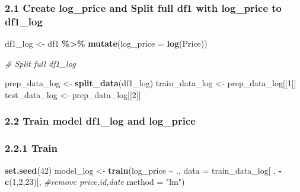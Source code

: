 \documentclass[
]{article}
\newenvironment{Shaded}{\begin{snugshade}}{\end{snugshade}}
\newcommand{\AttributeTok}[1]{\textcolor[rgb]{0.13,0.29,0.53}{#1}}
\newcommand{\CommentTok}[1]{\textcolor[rgb]{0.56,0.35,0.01}{\textit{#1}}}
\newcommand{\DecValTok}[1]{\textcolor[rgb]{0.00,0.00,0.81}{#1}}
\newcommand{\FunctionTok}[1]{\textcolor[rgb]{0.13,0.29,0.53}{\textbf{#1}}}
\newcommand{\NormalTok}[1]{#1}
\newcommand{\OtherTok}[1]{\textcolor[rgb]{0.56,0.35,0.01}{#1}}
\newcommand{\SpecialCharTok}[1]{\textcolor[rgb]{0.81,0.36,0.00}{\textbf{#1}}}
\newcommand{\StringTok}[1]{\textcolor[rgb]{0.31,0.60,0.02}{#1}}
\begin{document}
\hypertarget{create-log_price-and-split-full-df1-with-log_price-to-df1_log}{%
\subsubsection{2.1 Create log\_price and Split full df1 with log\_price
to
df1\_log}\label{create-log_price-and-split-full-df1-with-log_price-to-df1_log}}

\begin{Shaded}
\begin{Highlighting}[]
\NormalTok{df1\_log }\OtherTok{\textless{}{-}}\NormalTok{ df1 }\SpecialCharTok{\%\textgreater{}\%}
  \FunctionTok{mutate}\NormalTok{(}\AttributeTok{log\_price =} \FunctionTok{log}\NormalTok{(Price))}

\CommentTok{\# Split full df1\_log}

\NormalTok{prep\_data\_log }\OtherTok{\textless{}{-}} \FunctionTok{split\_data}\NormalTok{(df1\_log)}
\NormalTok{train\_data\_log }\OtherTok{\textless{}{-}}\NormalTok{ prep\_data\_log[[}\DecValTok{1}\NormalTok{]]}
\NormalTok{test\_data\_log }\OtherTok{\textless{}{-}}\NormalTok{ prep\_data\_log[[}\DecValTok{2}\NormalTok{]]}
\end{Highlighting}
\end{Shaded}

\hypertarget{train-model-df1_log-and-log_price}{%
\subsubsection{2.2 Train model df1\_log and
log\_price}\label{train-model-df1_log-and-log_price}}

\hypertarget{train-1}{%
\subsubsection{2.2.1 Train}\label{train-1}}

\begin{Shaded}
\begin{Highlighting}[]
\FunctionTok{set.seed}\NormalTok{(}\DecValTok{42}\NormalTok{)}
\NormalTok{model\_log }\OtherTok{\textless{}{-}} \FunctionTok{train}\NormalTok{(log\_price }\SpecialCharTok{\textasciitilde{}}\NormalTok{ .,}
               \AttributeTok{data =}\NormalTok{ train\_data\_log[ , }\SpecialCharTok{{-}}\FunctionTok{c}\NormalTok{(}\DecValTok{1}\NormalTok{,}\DecValTok{2}\NormalTok{,}\DecValTok{23}\NormalTok{)], }\CommentTok{\#remove price,id,date}
               \AttributeTok{method =} \StringTok{"lm"}\NormalTok{)}
\end{Highlighting}
\end{Shaded}
\end{document}

